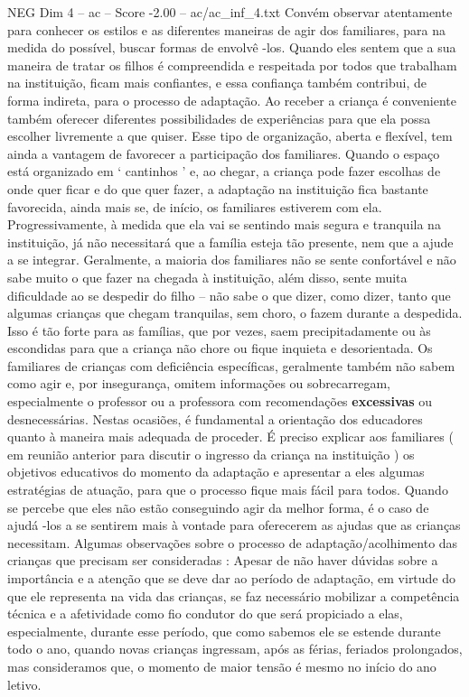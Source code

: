\begin{textsample}{NEG Dim 4 – ac – Score -2.00 – ac/ac\_inf\_4.txt}
Convém observar atentamente para conhecer os estilos e as diferentes maneiras de agir dos familiares, para na medida do possível, buscar formas de envolvê -los.
Quando eles sentem que a sua maneira de tratar os filhos é compreendida e respeitada por todos que trabalham na instituição, ficam mais confiantes, e essa confiança também contribui, de forma indireta, para o processo de adaptação.
Ao receber a criança é conveniente também oferecer diferentes possibilidades de experiências para que ela possa escolher livremente a que quiser.
Esse tipo de organização, aberta e flexível, tem ainda a vantagem de favorecer a participação dos familiares.
Quando o espaço está organizado em ‘ cantinhos ’ e, ao chegar, a criança pode fazer escolhas de onde quer ficar e do que quer fazer, a adaptação na instituição fica bastante favorecida, ainda mais se, de início, os familiares estiverem com ela.
Progressivamente, à medida que ela vai se sentindo mais segura e tranquila na instituição, já não necessitará que a família esteja tão presente, nem que a ajude a se integrar.
Geralmente, a maioria dos familiares não se sente confortável e não sabe muito o que fazer na chegada à instituição, além disso, sente muita dificuldade ao se despedir do filho – não sabe o que dizer, como dizer, tanto que algumas crianças que chegam tranquilas, sem choro, o fazem durante a despedida.
Isso é tão forte para as famílias, que por vezes, saem precipitadamente ou às escondidas para que a criança não chore ou fique inquieta e desorientada.
Os familiares de crianças com deficiência específicas, geralmente também não sabem como agir e, por insegurança, omitem informações ou sobrecarregam, especialmente o professor ou a professora com recomendações \textbf{excessivas} ou desnecessárias.
Nestas ocasiões, é fundamental a orientação dos educadores quanto à maneira mais adequada de proceder.
É preciso explicar aos familiares ( em reunião anterior para discutir o ingresso da criança na instituição ) os objetivos educativos do momento da adaptação e apresentar a eles algumas estratégias de atuação, para que o processo fique mais fácil para todos.
Quando se percebe que eles não estão conseguindo agir da melhor forma, é o caso de ajudá -los a se sentirem mais à vontade para oferecerem as ajudas que as crianças necessitam.
Algumas observações sobre o processo de adaptação/acolhimento das crianças que precisam ser consideradas : Apesar de não haver dúvidas sobre a importância e a atenção que se deve dar ao período de adaptação, em virtude do que ele representa na vida das crianças, se faz necessário mobilizar a competência técnica e a afetividade como fio condutor do que será propiciado a elas, especialmente, durante esse período, que como sabemos ele se estende durante todo o ano, quando novas crianças ingressam, após as férias, feriados prolongados, mas consideramos que, o momento de maior tensão é mesmo no início do ano letivo.

\end{textsample}
